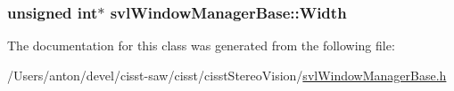 \subsubsection[{Width}]{\setlength{\rightskip}{0pt plus 5cm}unsigned int$\ast$ svl\+Window\+Manager\+Base\+::\+Width\hspace{0.3cm}{\ttfamily [protected]}}\label{classsvl_window_manager_base_ab118e08eda56a7e8a3ecccf6e9fc68b7}


The documentation for this class was generated from the following file\+:\begin{DoxyCompactItemize}
\item 
/\+Users/anton/devel/cisst-\/saw/cisst/cisst\+Stereo\+Vision/\hyperlink{svl_window_manager_base_8h}{svl\+Window\+Manager\+Base.\+h}\end{DoxyCompactItemize}
